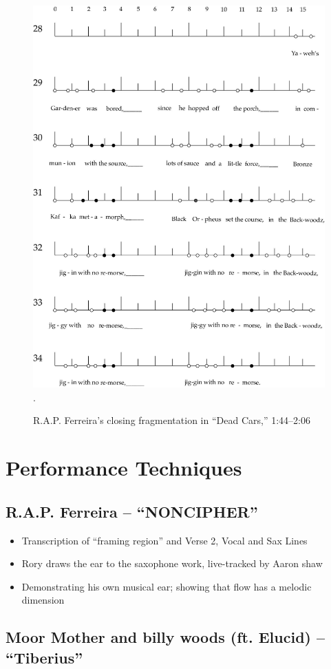     \begin{figure}[!htp]
        \centering
        \includegraphics{images/figures/chp 03/144206deadcarsendfrag.pdf}
        .\caption{R.A.P. Ferreira's closing fragmentation in ``Dead Cars,'' 1:44--2:06}
        \label{fig:roryclosingfrag}
    \end{figure}


\newpage
\section{Performance Techniques}
\subsection*{\centering R.A.P. Ferreira -- ``NONCIPHER''}
    \begin{itemize}
        \item Transcription of ``framing region'' and Verse 2, Vocal and Sax Lines
        \item Rory draws the ear to the saxophone work, live-tracked by Aaron shaw
        \item Demonstrating his own musical ear; showing that flow has a melodic dimension
    \end{itemize}
  
\subsection*{\centering Moor Mother and billy woods (ft. Elucid)  -- ``Tiberius''}
